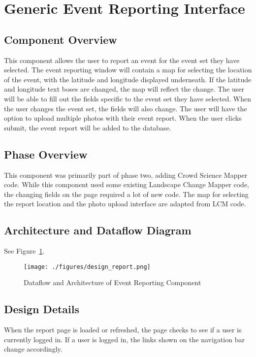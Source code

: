 \section{Generic Event Reporting Interface}

\subsection{Component  Overview}
This component allows the user to report an event for the event set they have selected. The event reporting window will contain a map for selecting the location of the event, with the latitude and longitude displayed underneath. If the latitude and longitude text boses are changed, the map will reflect the change. The user will be able to fill out the fields specific to the event set they have selected. When the user changes the event set, the fields will also change. The user will have the option to upload multiple photos with their event report. When the user clicks submit, the event report will be added to the database.

\subsection{Phase Overview}
This component was primarily part of phase two, adding Crowd Science Mapper code. While this component used some existing Landscape Change Mapper code, the changing fields on the page required a lot of new code. The map for selecting the report location and the photo upload interface are adapted from LCM code.

\subsection{ Architecture and Dataflow Diagram}
See Figure~\ref{design_report}.
\begin{figure}[tbh]
\begin{center}
\texttt{[image: ./figures/design\_report.png]}
\end{center}
\caption{Dataflow and Architecture of Event Reporting Component \label{design_report}}
\end{figure} 

\subsection{Design Details}
When the report page is loaded or refreshed, the page checks to see if a user is currently logged in. If a user is logged in, the links shown on the navigation bar change accordingly. 

